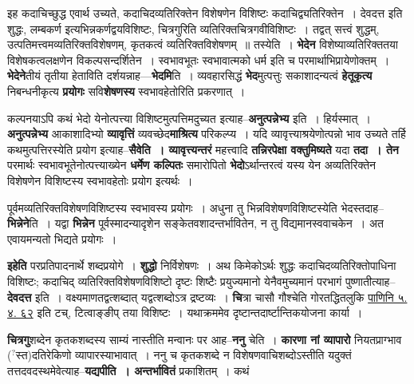 \documentclass[article,12pt,a4paper]{memoir}
\newcommand{\unclear}[1]{($^{?}$#1)}
\begin{document}
	इह कदाचिच्छुद्ध एवार्थ उच्यते, कदाचिदव्यतिरिक्तेन विशेषणेन विशिष्टः कदाचिद्व्यतिरिक्तेन । देवदत्त इति शुद्धः, लम्बकर्ण इत्यभिन्नकर्णद्वयविशिष्टः, चित्रगुरिति व्यतिरिक्तचित्रगवीविशिष्टः । तद्वत् सत्त्वं शुद्धम्, उत्पतिमत्त्वमव्यतिरिक्तविशेषणम्, कृतकत्वं व्यतिरिक्तविशेषणम् ॥ तस्येति । \textbf{भेदेन} विशेष्याव्यतिरिक्ततया विशेषकत्वलक्षणेन विकल्पसन्दर्शितेन । स्वभावभूतः स्वभावात्मको धर्म इति च परमार्थाभिप्रायेणोक्तम् । \textbf{भेदेने}तीयं तृतीया हेताविति दर्शयन्नाह—\textbf{भेदमि}ति । व्यवहारसिद्धं \textbf{भेद}मुत्पत्तुः सकाशादन्यत्वं \textbf{हेतूकृत्य} निबन्धनीकृत्य \textbf{प्रयोगः} सवि\textbf{शेषणस्य} स्वभावहेतोरिति प्रकरणात् ।
	\pend
      

	  \pstart कल्पनयाऽपि कथं भेदो येनोत्पत्त्या विशिष्टमुत्पत्तिमदुच्यत इत्याह--\textbf{अनुत्पन्नेभ्य} इति । हिर्यस्मात् । \textbf{अनुत्पन्नेभ्य} आकाशादिभ्यो \textbf{व्यावृत्तिं} व्यवच्छेद\textbf{माश्रित्य} परिकल्प्य । यदि व्यावृत्त्याश्रयेणोत्पन्नो भाव उच्यते तर्हि कथमुत्पत्तिरस्येति प्रयोग इत्याह--\textbf{सैवेति । व्यावृत्त्यन्तरं} महत्त्वादि \textbf{तन्निरपेक्षा वक्तुमिष्यते} यदा \textbf{तदा । तेन} परमार्थः स्वभावभूतेनोत्पत्त्याख्येन \textbf{धर्मेण कल्पितः} समारोपितो \textbf{भेदो}ऽर्थान्तरत्वं यस्य येन अव्यतिरिक्तेन विशेषणेन विशिष्टस्य स्वभावहेतोः प्रयोग इत्यर्थः ।
	\pend
      

	  \pstart पूर्वमव्यतिरिक्तविशेषणविशिष्टस्य स्वभावस्य प्रयोगः । अधुना तु भिन्नविशेषणविशिष्टस्येति भेदस्तदाह--\textbf{भिन्नेने}ति । यद्वा \textbf{भिन्नेन} पूर्वस्मादन्यादृशेन सङ्केतवशादन्तर्भावितेन, न तु विद्यमानस्ववाचकेन । अत एवायमन्यतो भिद्यते प्रयोगः ।
	\pend
      

	  \pstart \textbf{इहेति} परप्रतिपादनार्थे शब्दप्रयोगे । \textbf{शुद्धो} निर्विशेषणः । अथ किमेकोऽर्थः शुद्धः कदाचिदव्यतिरिक्तोपाधिना विशिष्टः; कदाचिद् व्यतिरिक्तविशेषणविशिष्टो दृष्टः शिष्टैः प्रयुज्यमानो येनैवमुच्यमानं परभागं पुष्णातीत्याह--\textbf{देवदत्त} इति । वक्ष्यमाणतद्वत्शब्दात् यद्वत्शब्दोऽत्र द्रष्टव्यः । \textbf{चि}त्रा चासौ गौश्चेति गोरतद्धितलुकि \href{http://sarit.indology.info/?cref=Pā.5.4.92}{पाणिनि ५. ४. ६२} इति टच्, टित्वाङ्ङीप् तया विशिष्टः । यथाक्रममेव दृष्टान्तदार्ष्टान्तिकयोजना कार्या ।
	\pend
      

	  \pstart \textbf{चित्रगु}शब्देन कृतकशब्दस्य साम्यं नास्तीति मन्वानः पर आह--\textbf{ननु} चेति । \textbf{कारणा नां व्यापारो} नियतप्राग्भाव \unclear{स्त}दतिरेकिणो व्यापारस्याभावात् । ननु च कृतकशब्दे न विशेषणवाचिशब्दोऽस्तीति यदुक्तं तत्तदवदस्थमेवेत्याह--\textbf{यद्यपीति । अन्तर्भावितं} प्रकाशितम् । कथं  \leavevmode{} 
	  
\end{document}
